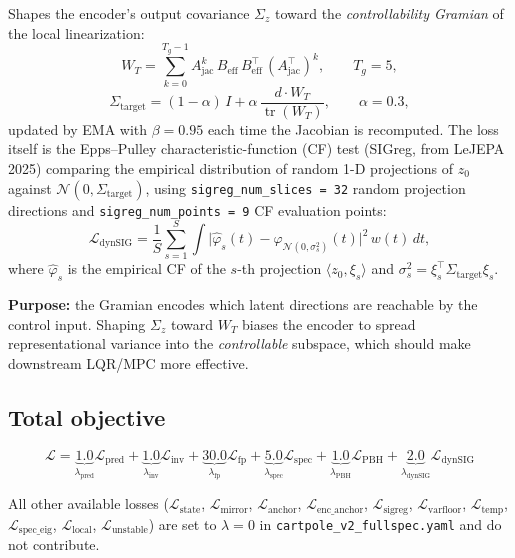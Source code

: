 \documentclass[11pt]{article}
\newcommand{\loss}[1]{\mathcal{L}_{\text{#1}}}
\begin{document}
Shapes the encoder's output covariance $\Sigma_z$ toward the
\emph{controllability Gramian} of the local linearization:
\begin{equation}
W_T = \sum_{k=0}^{T_g - 1} A_{\text{jac}}^k\, B_{\text{eff}}\, B_{\text{eff}}^\top\, (A_{\text{jac}}^\top)^k,
\qquad T_g = 5,
\end{equation}
\begin{equation}
\Sigma_{\text{target}} = (1 - \alpha)\, I + \alpha\, \frac{d \cdot W_T}{\operatorname{tr}(W_T)},
\qquad \alpha = 0.3,
\end{equation}
updated by EMA with $\beta = 0.95$ each time the Jacobian is recomputed. The
loss itself is the Epps--Pulley characteristic-function (CF) test (SIGreg, from
LeJEPA 2025) comparing the empirical distribution of random 1-D projections of
$z_0$ against $\mathcal{N}(0, \Sigma_{\text{target}})$, using
\texttt{sigreg\_num\_slices = 32} random projection directions and
\texttt{sigreg\_num\_points = 9} CF evaluation points:
\begin{equation}
\loss{dynSIG} = \frac{1}{S}\sum_{s=1}^{S}
\int \big| \hat\varphi_s(t) - \varphi_{\mathcal{N}(0,\sigma_s^2)}(t) \big|^2 \, w(t)\, dt,
\end{equation}
where $\hat\varphi_s$ is the empirical CF of the $s$-th projection
$\langle z_0, \xi_s \rangle$ and $\sigma_s^2 = \xi_s^\top \Sigma_{\text{target}} \xi_s$.

\textbf{Purpose:} the Gramian encodes which latent directions are reachable by
the control input. Shaping $\Sigma_z$ toward $W_T$ biases the encoder to spread
representational variance into the \emph{controllable} subspace, which should
make downstream LQR/MPC more effective.

\subsection{Total objective}
\begin{equation}
\boxed{
\mathcal{L} =
\underbrace{1.0}_{\lambda_{\text{pred}}} \loss{pred}
+ \underbrace{1.0}_{\lambda_{\text{inv}}} \loss{inv}
+ \underbrace{30.0}_{\lambda_{\text{fp}}} \loss{fp}
+ \underbrace{5.0}_{\lambda_{\text{spec}}} \loss{spec}
+ \underbrace{1.0}_{\lambda_{\text{PBH}}} \loss{PBH}
+ \underbrace{2.0}_{\lambda_{\text{dynSIG}}} \loss{dynSIG}
}
\end{equation}

All other available losses
($\loss{state}$, $\loss{mirror}$, $\loss{anchor}$, $\loss{enc\_anchor}$,
$\loss{sigreg}$, $\loss{varfloor}$, $\loss{temp}$, $\loss{spec\_eig}$,
$\loss{local}$, $\loss{unstable}$) are set to $\lambda = 0$ in
\texttt{cartpole\_v2\_fullspec.yaml} and do not contribute.
\end{document}

